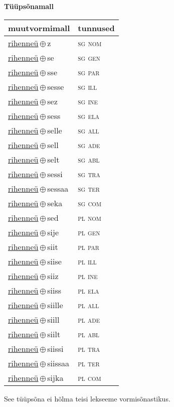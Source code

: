 

\vspace{3.5em}
\noindent \begin{minipage}{\textwidth}
\noindent \textbf{Tüüpsõnamall \,}\\

\begin{sideways}
\begin{tabular}{l l}
muutvormimall & tunnused \\
\hline
\underline{rihenneü}\,$\oplus$\,z & \textsc{ sg nom } \\
\underline{rihenneü}\,$\oplus$\,se & \textsc{ sg gen } \\
\underline{rihenneü}\,$\oplus$\,sse & \textsc{ sg par } \\
\underline{rihenneü}\,$\oplus$\,sesse & \textsc{ sg ill } \\
\underline{rihenneü}\,$\oplus$\,sez & \textsc{ sg ine } \\
\underline{rihenneü}\,$\oplus$\,sess & \textsc{ sg ela } \\
\underline{rihenneü}\,$\oplus$\,selle & \textsc{ sg all } \\
\underline{rihenneü}\,$\oplus$\,sell & \textsc{ sg ade } \\
\underline{rihenneü}\,$\oplus$\,selt & \textsc{ sg abl } \\
\underline{rihenneü}\,$\oplus$\,sessi & \textsc{ sg tra } \\
\underline{rihenneü}\,$\oplus$\,sessaa & \textsc{ sg ter } \\
\underline{rihenneü}\,$\oplus$\,seka & \textsc{ sg com } \\
\underline{rihenneü}\,$\oplus$\,sed & \textsc{ pl nom } \\
\underline{rihenneü}\,$\oplus$\,sije & \textsc{ pl gen } \\
\underline{rihenneü}\,$\oplus$\,siit & \textsc{ pl par } \\
\underline{rihenneü}\,$\oplus$\,siise & \textsc{ pl ill } \\
\underline{rihenneü}\,$\oplus$\,siiz & \textsc{ pl ine } \\
\underline{rihenneü}\,$\oplus$\,siiss & \textsc{ pl ela } \\
\underline{rihenneü}\,$\oplus$\,siille & \textsc{ pl all } \\
\underline{rihenneü}\,$\oplus$\,siill & \textsc{ pl ade } \\
\underline{rihenneü}\,$\oplus$\,siilt & \textsc{ pl abl } \\
\underline{rihenneü}\,$\oplus$\,siissi & \textsc{ pl tra } \\
\underline{rihenneü}\,$\oplus$\,siissaa & \textsc{ pl ter } \\
\underline{rihenneü}\,$\oplus$\,sijka & \textsc{ pl com } \\
\end{tabular}
\end{sideways}
\label{tab:tüüpsõnamall-rihenneüz}

\end{minipage}

 
\vspace{1em}
\noindent See tüüpsõna ei hõlma teisi lekseeme vormi\-sõnastikus.

